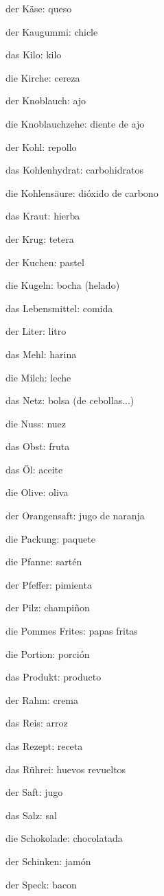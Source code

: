\begin{multicols}{2}
\begin{myitemize}
\item der Käse: queso
\item der Kaugummi: chicle
\item das Kilo: kilo
\item die Kirche: cereza
\item der Knoblauch: ajo
\item die Knoblauchzehe: diente de ajo
\item der Kohl: repollo
\item das Kohlenhydrat: carbohidratos
\item die Kohlensäure: dióxido de carbono
\item das Kraut: hierba
\item der Krug: tetera
\item der Kuchen: pastel
\item die Kugeln: bocha (helado)
\item das Lebensmittel: comida
\item der Liter: litro
\item das Mehl: harina
\item die Milch: leche
\item das Netz: bolsa (de cebollas...)
\item die Nuss: nuez
\item das Obst: fruta
\item das Öl: aceite
\item die Olive: oliva
\item der Orangensaft: jugo de naranja
\item die Packung: paquete
\item die Pfanne: sartén
\item der Pfeffer: pimienta
\item der Pilz: champiñon
\item die Pommes Frites: papas fritas
\item die Portion: porción
\item das Produkt: producto
\item der Rahm: crema
\item das Reis: arroz
\item das Rezept: receta
\item das Rührei: huevos revueltos
\item der Saft: jugo
\item das Salz: sal
\item die Schokolade: chocolatada
\item der Schinken: jamón
\item der Speck: bacon

\end{myitemize}
\end{multicols}

